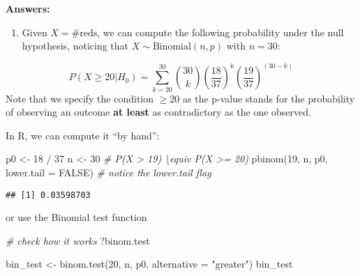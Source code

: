 \documentclass[
  oneside]{book}
\newenvironment{Shaded}{\begin{snugshade}}{\end{snugshade}}
\newcommand{\AttributeTok}[1]{\textcolor[rgb]{0.77,0.63,0.00}{#1}}
\newcommand{\CommentTok}[1]{\textcolor[rgb]{0.56,0.35,0.01}{\textit{#1}}}
\newcommand{\ConstantTok}[1]{\textcolor[rgb]{0.00,0.00,0.00}{#1}}
\newcommand{\DecValTok}[1]{\textcolor[rgb]{0.00,0.00,0.81}{#1}}
\newcommand{\FunctionTok}[1]{\textcolor[rgb]{0.00,0.00,0.00}{#1}}
\newcommand{\NormalTok}[1]{#1}
\newcommand{\OtherTok}[1]{\textcolor[rgb]{0.56,0.35,0.01}{#1}}
\newcommand{\SpecialCharTok}[1]{\textcolor[rgb]{0.00,0.00,0.00}{#1}}
\newcommand{\StringTok}[1]{\textcolor[rgb]{0.31,0.60,0.02}{#1}}
\providecommand{\tightlist}{%
  \setlength{\itemsep}{0pt}\setlength{\parskip}{0pt}}
\begin{document}
\textbf{Answers:}

\begin{enumerate}
\def\labelenumi{\alph{enumi}.}
\tightlist
\item
  Given \(X = \#\text{reds}\), we can compute the following probability
  under the null hypothesis,
  noticing that \(X \sim \text{Binomial}(n, p)\) with \(n = 30\):
\end{enumerate}

\[
P(X \geq 20 | H_0) = \sum_{k = 20}^{30} {30 \choose k}
\left(\frac{18}{37}\right)^k\left(\frac{19}{37}\right)^{(30-k)}
\]
Note that we specify the condition \(\geq 20\) as the p-value stands for the
probability of observing an outcome \textbf{at least} as contradictory as the one
observed.

In R, we can compute it ``by hand'':

\begin{Shaded}
\begin{Highlighting}[]
\NormalTok{p0 }\OtherTok{\textless{}{-}} \DecValTok{18} \SpecialCharTok{/} \DecValTok{37}
\NormalTok{n }\OtherTok{\textless{}{-}} \DecValTok{30}
\CommentTok{\# P(X \textgreater{} 19) \textbackslash{}equiv P(X \textgreater{}= 20)}
\FunctionTok{pbinom}\NormalTok{(}\DecValTok{19}\NormalTok{, n, p0, }\AttributeTok{lower.tail =} \ConstantTok{FALSE}\NormalTok{) }\CommentTok{\# notice the lower.tail flag}
\end{Highlighting}
\end{Shaded}

\begin{verbatim}
## [1] 0.03598703
\end{verbatim}

or use the Binomial test function

\begin{Shaded}
\begin{Highlighting}[]
\CommentTok{\# check how it works}
\NormalTok{?binom.test}
\end{Highlighting}
\end{Shaded}

\begin{Shaded}
\begin{Highlighting}[]
\NormalTok{bin\_test }\OtherTok{\textless{}{-}} \FunctionTok{binom.test}\NormalTok{(}\DecValTok{20}\NormalTok{, n, p0, }\AttributeTok{alternative =} \StringTok{"greater"}\NormalTok{)}
\NormalTok{bin\_test}
\end{Highlighting}
\end{Shaded}
\end{document}
